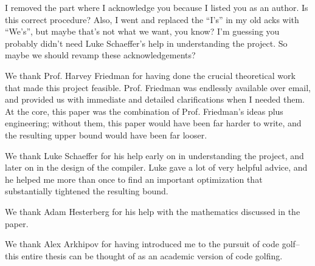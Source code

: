 \documentclass[11pt]{article}
\begin{document}
{\color{red} I removed the part where I acknowledge you because I listed you as an author. Is this correct procedure? Also, I went and replaced the ``I's'' in my old acks with ``We's'', but maybe that's not what we want, you know? I'm guessing you probably didn't need Luke Schaeffer's help in understanding the project. So maybe we should revamp these acknowledgements?}

We thank Prof. Harvey Friedman for having done the crucial theoretical work that made this project feasible. Prof. Friedman was endlessly available over email, and provided us with immediate and detailed clarifications when I needed them. At the core, this paper was the combination of Prof. Friedman's ideas plus engineering; without them, this paper would have been far harder to write, and the resulting upper bound would have been far looser.

We thank Luke Schaeffer for his help early on in understanding the project, and later on in the design of the compiler. Luke gave a lot of very helpful advice, and he helped me more than once to find an important optimization that substantially tightened the resulting bound.

We thank Adam Hesterberg for his help with the mathematics discussed in the paper.

We thank Alex Arkhipov for having introduced me to the pursuit of code golf--this entire thesis can be thought of as an academic version of code golfing.
\end{document}

